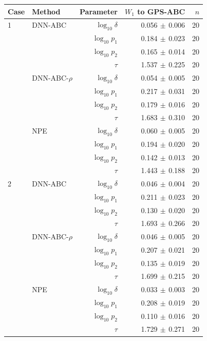 \begin{tabular}{llrrr}
\toprule
Case & Method & Parameter & $W_1$ to GPS-ABC & $n$ \\
\midrule
1 & DNN-ABC & $\log_{10}\delta$ & 0.056$\,\pm\,$0.006 & 20 \\
 &  & $\log_{10}p_1$ & 0.184$\,\pm\,$0.023 & 20 \\
 &  & $\log_{10}p_2$ & 0.165$\,\pm\,$0.014 & 20 \\
 &  & $\tau$ & 1.537$\,\pm\,$0.225 & 20 \\
 & DNN-ABC-$\rho$ & $\log_{10}\delta$ & 0.054$\,\pm\,$0.005 & 20 \\
 &  & $\log_{10}p_1$ & 0.217$\,\pm\,$0.031 & 20 \\
 &  & $\log_{10}p_2$ & 0.179$\,\pm\,$0.016 & 20 \\
 &  & $\tau$ & 1.683$\,\pm\,$0.310 & 20 \\
 & NPE & $\log_{10}\delta$ & 0.060$\,\pm\,$0.005 & 20 \\
 &  & $\log_{10}p_1$ & 0.194$\,\pm\,$0.020 & 20 \\
 &  & $\log_{10}p_2$ & 0.142$\,\pm\,$0.013 & 20 \\
 &  & $\tau$ & 1.443$\,\pm\,$0.188 & 20 \\
\midrule
2 & DNN-ABC & $\log_{10}\delta$ & 0.046$\,\pm\,$0.004 & 20 \\
 &  & $\log_{10}p_1$ & 0.211$\,\pm\,$0.023 & 20 \\
 &  & $\log_{10}p_2$ & 0.130$\,\pm\,$0.020 & 20 \\
 &  & $\tau$ & 1.693$\,\pm\,$0.266 & 20 \\
 & DNN-ABC-$\rho$ & $\log_{10}\delta$ & 0.046$\,\pm\,$0.005 & 20 \\
 &  & $\log_{10}p_1$ & 0.207$\,\pm\,$0.021 & 20 \\
 &  & $\log_{10}p_2$ & 0.135$\,\pm\,$0.019 & 20 \\
 &  & $\tau$ & 1.699$\,\pm\,$0.215 & 20 \\
 & NPE & $\log_{10}\delta$ & 0.033$\,\pm\,$0.003 & 20 \\
 &  & $\log_{10}p_1$ & 0.208$\,\pm\,$0.019 & 20 \\
 &  & $\log_{10}p_2$ & 0.110$\,\pm\,$0.016 & 20 \\
 &  & $\tau$ & 1.729$\,\pm\,$0.271 & 20 \\
\bottomrule
\end{tabular}
